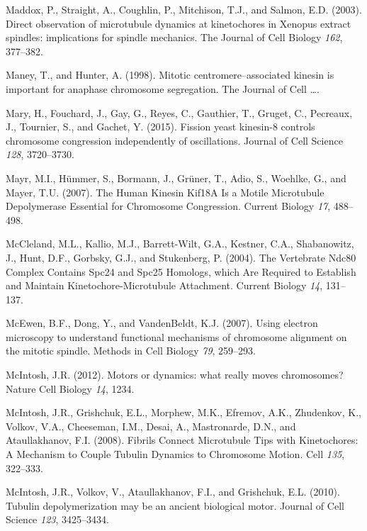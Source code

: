\documentclass[12pt,a4paper,twoside,openright]{book}
\begin{document}
Maddox, P., Straight, A., Coughlin, P., Mitchison, T.J., and Salmon,
E.D. (2003). Direct observation of microtubule dynamics at kinetochores
in Xenopus extract spindles: implications for spindle mechanics. The
Journal of Cell Biology \emph{162}, 377--382.

Maney, T., and Hunter, A. (1998). Mitotic centromere--associated kinesin
is important for anaphase chromosome segregation. The Journal of Cell
\ldots{}.

Mary, H., Fouchard, J., Gay, G., Reyes, C., Gauthier, T., Gruget, C.,
Pecreaux, J., Tournier, S., and Gachet, Y. (2015). Fission yeast
kinesin-8 controls chromosome congression independently of oscillations.
Journal of Cell Science \emph{128}, 3720--3730.

Mayr, M.I., Hümmer, S., Bormann, J., Grüner, T., Adio, S., Woehlke, G.,
and Mayer, T.U. (2007). The Human Kinesin Kif18A Is a Motile Microtubule
Depolymerase Essential for Chromosome Congression. Current Biology
\emph{17}, 488--498.

McCleland, M.L., Kallio, M.J., Barrett-Wilt, G.A., Kestner, C.A.,
Shabanowitz, J., Hunt, D.F., Gorbsky, G.J., and Stukenberg, P. (2004).
The Vertebrate Ndc80 Complex Contains Spc24 and Spc25 Homologs, which
Are Required to Establish and Maintain Kinetochore-Microtubule
Attachment. Current Biology \emph{14}, 131--137.

McEwen, B.F., Dong, Y., and VandenBeldt, K.J. (2007). Using electron
microscopy to understand functional mechanisms of chromosome alignment
on the mitotic spindle. Methods in Cell Biology \emph{79}, 259--293.

McIntosh, J.R. (2012). Motors or dynamics: what really moves
chromosomes? Nature Cell Biology \emph{14}, 1234.

McIntosh, J.R., Grishchuk, E.L., Morphew, M.K., Efremov, A.K.,
Zhudenkov, K., Volkov, V.A., Cheeseman, I.M., Desai, A., Mastronarde,
D.N., and Ataullakhanov, F.I. (2008). Fibrils Connect Microtubule Tips
with Kinetochores: A Mechanism to Couple Tubulin Dynamics to Chromosome
Motion. Cell \emph{135}, 322--333.

McIntosh, J.R., Volkov, V., Ataullakhanov, F.I., and Grishchuk, E.L.
(2010). Tubulin depolymerization may be an ancient biological motor.
Journal of Cell Science \emph{123}, 3425--3434.
\end{document}

